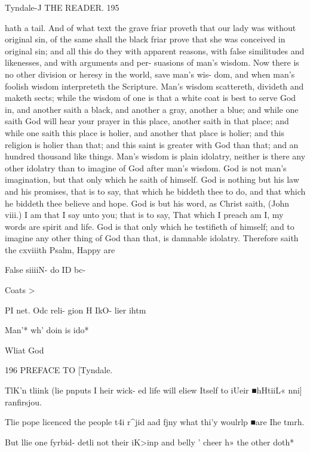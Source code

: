 \documentclass{custom}
\begin{document}
Tyndale-J 
THE READER. 
195

hath a tail. And of what text the grave friar 
proveth that our lady was without original sin, 
of the same shall the black friar prove that she 
was conceived in original sin; and all this do 
they with apparent reasons, with false similitudes 
and likenesses, and with arguments and per- 
suasions of man's wisdom. Now there is no other 
division or heresy in the world, save man's wis- 
dom, and when man's foolish wisdom interpreteth 
the Scripture. Man's wisdom scattereth, divideth 
and maketh sects; while the wisdom of one is 
that a white coat is best to serve God in, and 
another saith a black, and another a gray, another 
a blue; and while one saith God will hear your 
prayer in this place, another saith in that place;
and while one saith this place is holier, and 
another that place is holier; and this religion is 
holier than that; and this saint is greater with 
God than that; and an hundred thousand like 
things. Man's wisdom is plain idolatry, neither 
is there any other idolatry than to imagine of God 
after man's wisdom. God is not man's imagination, 
but that only which he saith of himself. God is 
nothing but his law and his promises, that is to say, 
that which he biddeth thee to do, and that which 
he biddeth thee believe and hope. God is but his 
word, as Christ saith, (John viii.) I am that I say 
unto you; that is to say, That which I preach am 
I, my words are spirit and life. God is that only 
which he testifieth of himself; and to imagine any 
other thing of God than that, is damnable idolatry. 
Therefore saith the cxviiith Psalm, Happy are 

False siiiiN- 
do ID bc- 

Coats > 

PI net. 
Odc reli- 
gion H IkO- 
lier ihtm 

Man'* wh' 
doin is ido* 

Wliat God 


196 
PREFACE TO 
[Tyndale.

TlK'n tliink 
(lie pnputs 
I heir wick- 
ed life will 
eliew Itself 
to iUeir 
■hHtiiL« nni] 
ranfirsjou. 

Tlie pope 
licenced 
the people 
t4i r^jid aad 
fjny what 
thi'y woulrlp 
■are Ihe 
tmrh. 

But llie 
one fyrbid- 
detli not 
their iK>inp 
and belly ' 
cheer h» the 
other doth* 
\end{document}
